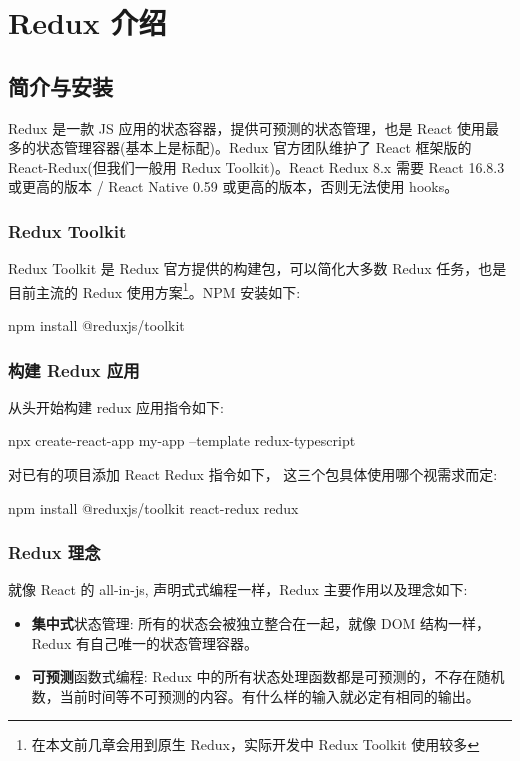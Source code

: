 
\section{Redux 介绍}

\subsection{简介与安装}

Redux 是一款 JS 应用的状态容器，提供可预测的状态管理，也是 React 使用最多的状态管理容器(基本上是标配)。Redux 官方团队维护了 React 框架版的 React-Redux(但我们一般用 Redux Toolkit)。React Redux 8.x 需要 React 16.8.3 或更高的版本 / React Native 0.59 或更高的版本，否则无法使用 hooks。

\subsubsection*{Redux Toolkit}

Redux Toolkit 是 Redux 官方提供的构建包，可以简化大多数 Redux 任务，也是目前主流的 Redux 使用方案\footnote{在本文前几章会用到原生 Redux，实际开发中 Redux Toolkit 使用较多}。NPM 安装如下:

\begin{bash}
npm install @reduxjs/toolkit
\end{bash}

\subsubsection*{构建 Redux 应用}

从头开始构建 redux 应用指令如下:

\begin{bash}
npx create-react-app my-app --template redux-typescript
\end{bash}

对已有的项目添加 React Redux 指令如下， 这三个包具体使用哪个视需求而定:

\begin{bash}
npm install @reduxjs/toolkit react-redux redux
\end{bash}

\subsubsection*{Redux 理念}

就像 React 的 all-in-js, 声明式式编程一样，Redux 主要作用以及理念如下:
\begin{itemize}
  \item \textbf{集中式}状态管理: 所有的状态会被独立整合在一起，就像 DOM 结构一样，Redux 有自己唯一的状态管理容器。
  \item \textbf{可预测}函数式编程: Redux 中的所有状态处理函数都是可预测的，不存在随机数，当前时间等不可预测的内容。有什么样的输入就必定有相同的输出。
\end{itemize}

